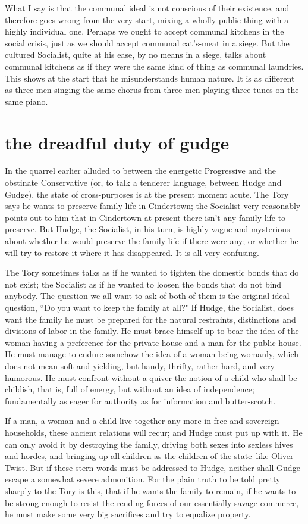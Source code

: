 \documentclass[final,10pt,letterpaper,twocolumn,openany]{book}
\begin{document}
What I say is that the communal ideal is not conscious
of their existence, and therefore goes wrong from the very start, mixing a
wholly public thing with a highly individual one. Perhaps we ought to
accept communal kitchens in the social crisis, just as we should accept
communal cat's-meat in a siege. But the cultured Socialist, quite at his
ease, by no means in a siege, talks about communal kitchens as if they
were the same kind of thing as communal laundries. This shows at the
start that he misunderstands human nature. It is as different as three men
singing the same chorus from three men playing three tunes on the same
piano.

\section{the dreadful duty of gudge}

    In the quarrel earlier alluded to between the energetic Progressive and
the obstinate Conservative (or, to talk a tenderer language, between Hudge
and Gudge), the state of cross-purposes is at the present moment acute.
The Tory says he wants to preserve family life in Cindertown; the Socialist
very reasonably points out to him that in Cindertown at present there isn't
any family life to preserve. But Hudge, the Socialist, in his turn, is highly
vague and mysterious about whether he would preserve the family life if
there were any; or whether he will try to restore it where it has disappeared.
It is all very confusing. 

The Tory sometimes talks as if he wanted to
tighten the domestic bonds that do not exist; the Socialist as if he wanted
to loosen the bonds that do not bind anybody. The question we all want to
ask of both of them is the original ideal question, ``Do you want to keep
the family at all?" If Hudge, the Socialist, does want the family he must be
prepared for the natural restraints, distinctions and divisions of labor in the
family. He must brace himself up to bear the idea of the woman having a
preference for the private house and a man for the public house. He must
manage to endure somehow the idea of a woman being womanly, which
does not mean soft and yielding, but handy, thrifty, rather hard, and very
humorous. He must confront without a quiver the notion of a child who
shall be childish, that is, full of energy, but without an idea of
independence; fundamentally as eager for authority as for information and
butter-scotch. 

If a man, a woman and a child live together any more in free
and sovereign households, these ancient relations will recur; and Hudge
must put up with it. He can only avoid it by destroying the family, driving
both sexes into sexless hives and hordes, and bringing up all children as
the children of the state--like Oliver Twist. But if these stern words must
be addressed to Hudge, neither shall Gudge escape a somewhat severe
admonition. For the plain truth to be told pretty sharply to the Tory is this,
that if he wants the family to remain, if he wants to be strong enough to
resist the rending forces of our essentially savage commerce, he must
make some very big sacrifices and try to equalize property. 
\end{document}
